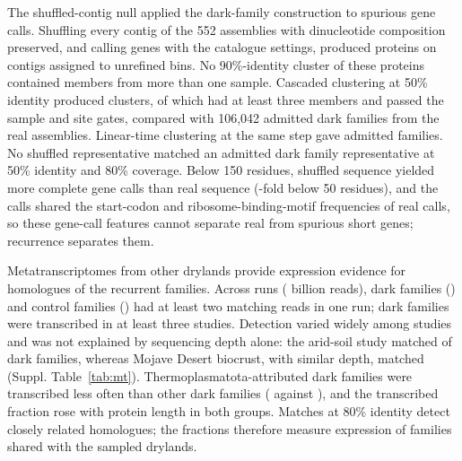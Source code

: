 The shuffled-contig null applied the dark-family construction to spurious gene calls. Shuffling every contig of the 552 assemblies with dinucleotide composition preserved, and calling genes with the catalogue settings, produced  proteins on contigs assigned to unrefined bins. No 90\%-identity cluster of these proteins contained members from more than one sample. Cascaded clustering at 50\% identity produced  clusters, of which  had at least three members and passed the sample and site gates, compared with 106,042 admitted dark families from the real assemblies. Linear-time clustering at the same step gave  admitted families. No shuffled representative matched an admitted dark family representative at 50\% identity and 80\% coverage. Below 150 residues, shuffled sequence yielded more complete gene calls than real sequence (-fold below 50 residues), and the calls shared the start-codon and ribosome-binding-motif frequencies of real calls, so these gene-call features cannot separate real from spurious short genes; recurrence separates them.

Metatranscriptomes from other drylands provide expression evidence for homologues of the recurrent families. Across  runs ( billion reads),  dark families () and  control families () had at least two matching reads in one run;  dark families were transcribed in at least three studies. Detection varied widely among studies and was not explained by sequencing depth alone: the arid-soil study matched  of dark families, whereas Mojave Desert biocrust, with similar depth, matched  (Suppl. Table~\ref{tab:mt}). Thermoplasmatota-attributed dark families were transcribed less often than other dark families ( against ), and the transcribed fraction rose with protein length in both groups. Matches at 80\% identity detect closely related homologues; the fractions therefore measure expression of families shared with the sampled drylands.

